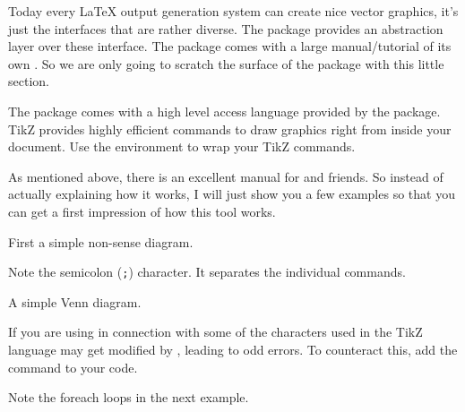 Today every \LaTeX{} output generation system can create nice vector graphics,
it's just the interfaces that are rather diverse. The  package provides an
abstraction layer over these interface. The
 package comes with a large manual/tutorial of its own
\cite{pgfplot}. So we are only going to scratch the surface of the package with this little
section.

The  package comes with a high level access language provided by the   package.
TikZ provides highly efficient commands to
draw graphics right from inside your document. Use the 
environment to wrap your TikZ commands.

As mentioned above, there is an excellent manual for  and friends. So
instead of actually explaining how it works, I will just show you a few examples
so that you can get a first impression of how this tool works.

First a simple non-sense diagram.
\begin{example}
\end{example}
Note the semicolon (\texttt{;}) character. It separates the individual commands.

A simple Venn diagram.
\begin{example}
\shorthandoff{:}
\end{example}
If you are using  in connection with  some of the characters used in the
TikZ language may get modified by , leading to odd errors. To counteract this, add 
the  command to your code.

Note the foreach loops in the next example.
\begin{example}
\end{example}

